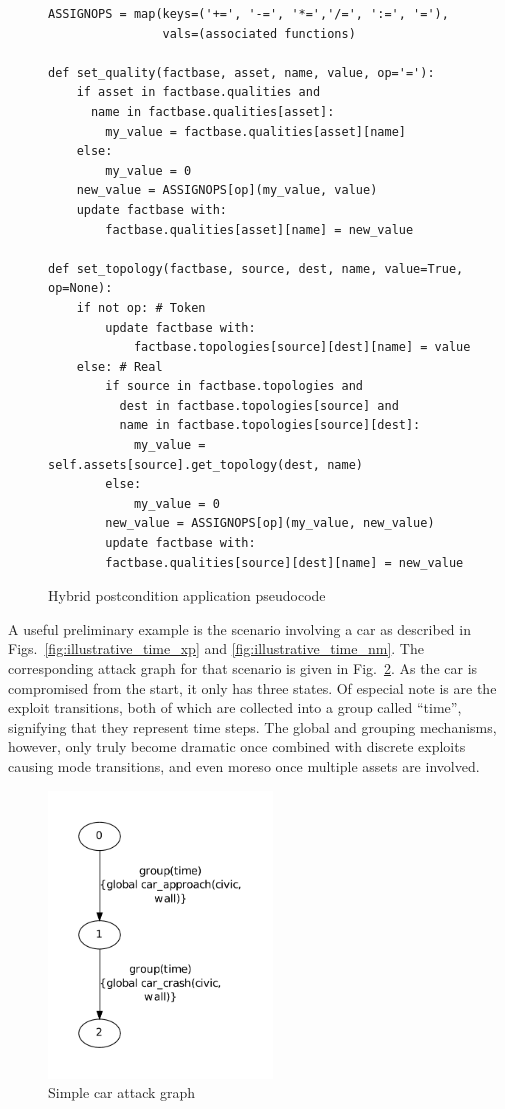 \begin{figure}
\begin{lstlisting}
ASSIGNOPS = map(keys=('+=', '-=', '*=','/=', ':=', '='),
                vals=(associated functions)

def set_quality(factbase, asset, name, value, op='='):
    if asset in factbase.qualities and
      name in factbase.qualities[asset]:
        my_value = factbase.qualities[asset][name]
    else:
        my_value = 0
    new_value = ASSIGNOPS[op](my_value, value)
    update factbase with:
        factbase.qualities[asset][name] = new_value

def set_topology(factbase, source, dest, name, value=True, op=None):
    if not op: # Token
        update factbase with:
            factbase.topologies[source][dest][name] = value
    else: # Real
        if source in factbase.topologies and
          dest in factbase.topologies[source] and
          name in factbase.topologies[source][dest]:
            my_value = self.assets[source].get_topology(dest, name)
        else:
            my_value = 0
        new_value = ASSIGNOPS[op](my_value, new_value)
        update factbase with:
        factbase.qualities[source][dest][name] = new_value
\end{lstlisting}
\caption{Hybrid postcondition application pseudocode}
\label{fig:hybrid-postcondition}
\end{figure}
A useful preliminary example is the scenario involving a car as described in
Figs.~\ref{fig:illustrative_time_xp} and \ref{fig:illustrative_time_nm}. The
corresponding attack graph for that scenario is given in 
Fig.~\ref{fig:fullbunny_simple_ag}. As the car is compromised from the start,
it only has three states. Of especial note is are the exploit transitions,
both of which are collected into a group called ``time'', signifying that
they represent time steps. The global and grouping mechanisms, however, only 
truly become dramatic once combined with discrete exploits causing mode %
transitions, and even moreso once multiple assets are involved.

\begin{figure}
\includegraphics[height=3in]{ag_car/simple/full_bunny_1_ag_5}
\caption{Simple car attack graph}
\label{fig:fullbunny_simple_ag}
\end{figure}

